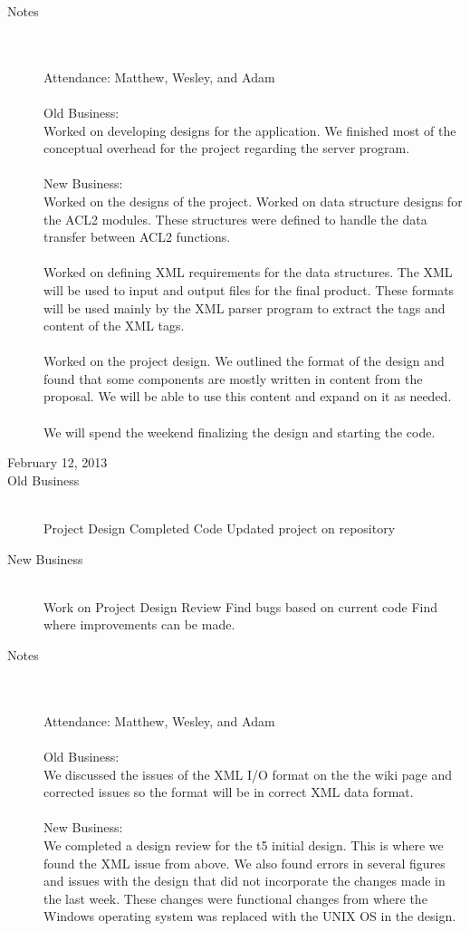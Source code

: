 \documentclass[11pt, letterpaper]{report}
\begin{document}
\begin{description}
\item[Notes] \hfill \\ \hfill \\
Attendance:  Matthew, Wesley, and Adam\\ \\
Old Business: \\
Worked on developing designs for the application. We finished most of the conceptual overhead for the project regarding the server program.
\\ \\
New Business: \\
Worked on the designs of the project. Worked on data structure designs for the ACL2 modules. These structures were defined to handle the data transfer between ACL2 functions. \\ \\
Worked on defining XML requirements for the data structures. The XML will be used to input and output files for the final product. These formats will be used mainly by the XML parser program to extract the tags and content of the XML tags. \\ \\
Worked on the project design. We outlined the format of the design and found that some components are mostly written in content from the proposal. We will be able to use this content and expand on it as needed. \\ \\
We will spend the weekend finalizing the design and starting the code.



\newpage
\item[\Large February 12, 2013]
\hypertarget{February 12, 2013} {}
\item[Old Business] \hfill \\
\subitem Project Design
\subitem Completed Code
\subitem Updated project on repository
\item[New Business] \hfill \\
\subitem Work on Project Design Review
\subsubitem Find bugs based on current code
\subsubitem Find where improvements can be made.

\item[Notes] \hfill \\ \hfill \\
Attendance:  Matthew, Wesley, and Adam\\ \\
Old Business: \\
We discussed the issues of the XML I/O format on the the wiki page and corrected issues so the format will be in correct XML data format.
\\ \\
New Business: \\
We completed a design review for the t5 initial design. This is where we found the XML issue from above. We also found errors in several figures and issues with the design that did not incorporate the changes made in the last week. These changes were functional changes from where the Windows operating system was replaced with the UNIX OS in the design.



\end{description}
\end{document}
